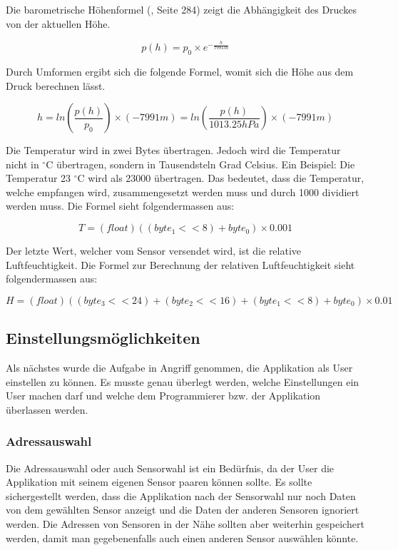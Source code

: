 Die barometrische Höhenformel (\cite{Formelbuch}, Seite 284) zeigt die Abhängigkeit des Druckes von der aktuellen Höhe.

\begin{equation}
	p(h) = p_0 \times e^{-\frac{h}{7991 m}}
\end{equation}

Durch Umformen ergibt sich die folgende Formel, womit sich die Höhe aus dem Druck berechnen lässt.

\begin{equation}
	h = ln(\frac{p(h)}{p_0}) \times (-7991 m) = ln(\frac{p(h)}{1013.25 hPa}) \times (-7991 m)
\end{equation}

Die Temperatur wird in zwei Bytes übertragen. Jedoch wird die Temperatur nicht in $^\circ$C übertragen, sondern in Tausendsteln Grad Celsius. Ein Beispiel: Die Temperatur 23 $^\circ$C wird als 23000 übertragen. Das bedeutet, dass die Temperatur, welche empfangen wird, zusammengesetzt werden muss und durch 1000 dividiert werden muss. Die Formel sieht folgendermassen aus:

\begin{equation}
	T = (float)((byte_1 << 8) + byte_0) \times 0.001
\end{equation}

Der letzte Wert, welcher vom Sensor versendet wird, ist die relative Luftfeuchtigkeit. Die Formel zur Berechnung der relativen Luftfeuchtigkeit sieht folgendermassen aus:

\begin{equation}
	H = (float)((byte_3 << 24) + (byte_2 << 16) + (byte_1 << 8) + byte_0) \times 0.01
\end{equation}


\subsection{Einstellungsmöglichkeiten}

Als nächstes wurde die Aufgabe in Angriff genommen, die Applikation als User einstellen zu können. Es musste genau überlegt werden, welche Einstellungen ein User machen darf und welche dem Programmierer bzw. der Applikation überlassen werden.


\subsubsection{Adressauswahl}

Die Adressauswahl oder auch Sensorwahl ist ein Bedürfnis, da der User die Applikation mit seinem eigenen Sensor paaren können sollte. Es sollte sichergestellt werden, dass die Applikation nach der Sensorwahl nur noch Daten von dem gewählten Sensor anzeigt und die Daten der anderen Sensoren ignoriert werden. Die Adressen von Sensoren in der Nähe sollten aber weiterhin gespeichert werden, damit man gegebenenfalls auch einen anderen Sensor auswählen könnte.\\

